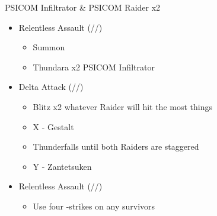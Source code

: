 \documentclass{report}
\begin{document}
\renewcommand{\first}{[1] Relentless Assault (\rav/\rav/\com)}
\renewcommand{\second}{[2] Delta Attack (\com/\rav/\sen)}
\begin{battle}{PSICOM Infiltrator \& PSICOM Raider x2}
\begin{itemize}
    \item \first
    \begin{itemize}
        \item Summon
        \item Thundara x2 PSICOM Infiltrator
    \end{itemize}
    \item \second
    \begin{itemize}
        \item Blitz x2 whatever Raider will hit the most things
        \item X - Gestalt
        \item Thunderfalls until both Raiders are staggered
        \item Y - Zantetsuken
    \end{itemize}
    \item \first
    \begin{itemize}
        \item Use four -strikes on any survivors
    \end{itemize}
\end{itemize}
  
\end{battle}
\end{document}
